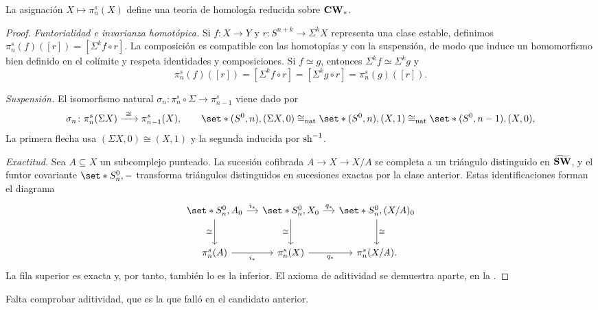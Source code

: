 \begin{lema}\label{lema:pisteor}
La asignación $X\mapsto\pi_n^s(X)$ define una teoría de homología reducida sobre $\mathbf{CW}_*$.
\end{lema}
\begin{proof}
\emph{Funtorialidad e invarianza homotópica.} Si $f\colon X\to Y$ y $r\colon S^{n+k}\to\Sigma^kX$ representa una clase estable, definimos $\pi_n^s(f)([r])=[\Sigma^kf\circ r]$. La composición es compatible con las homotopías y con la suspensión, de modo que induce un homomorfismo bien definido en el colímite y respeta identidades y composiciones. Si $f\simeq g$, entonces $\Sigma^kf\simeq\Sigma^kg$ y
\[
\pi_n^s(f)([r])=[\Sigma^kf\circ r]=[\Sigma^kg\circ r]=\pi_n^s(g)([r]).
\]

\emph{Suspensión.} El isomorfismo natural $\sigma_n\colon\pi_n^s\circ\Sigma\to\pi_{n-1}^s$ viene dado por
\[
\sigma_n\colon\pi_n^s(\Sigma X)\xrightarrow{\ \cong\ }\pi_{n-1}^s(X),
\qquad
\set*{(S^0,n),(\Sigma X,0)} \cong_{\text{nat}} \set*{(S^0,n),(X,1)} \cong_{\text{nat}} \set*{(S^0,n-1),(X,0)},
\]
La primera flecha usa $(\Sigma X,0)\cong(X,1)$ y la segunda inducida por $\operatorname{sh}^{-1}$.

\emph{Exactitud.} Sea $A\subseteq X$ un subcomplejo punteado. La sucesión cofibrada $A\to X\to X/A$ se completa a un triángulo distinguido en $\widetilde{\mathbf{SW}}$, y el funtor covariante $\set*{S^0_n,-}$ transforma triángulos distinguidos en sucesiones exactas por la clase anterior. Estas identificaciones forman el diagrama
\[
\begin{tikzcd}[column sep=small,row sep=large]
\set*{S^0_n,A_0} \arrow[r,"i_*"] \arrow[d,"\cong"'] & \set*{S^0_n,X_0} \arrow[r,"q_*"] \arrow[d,"\cong"'] & \set*{S^0_n,(X/A)_0} \arrow[d,"\cong"]\\
\pi_n^s(A) \arrow[r,"i_*"'] & \pi_n^s(X) \arrow[r,"q_*"'] & \pi_n^s(X/A).
\end{tikzcd}
\]
La fila superior es exacta y, por tanto, también lo es la inferior.
El axioma de aditividad se demuestra aparte, en la .
\end{proof}

Falta comprobar aditividad, que es la que falló en el candidato anterior.

